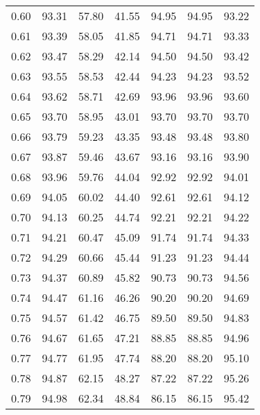 \begin{tabular}{|c|c|c|c|c|c|c|}
      0.60 &     93.31 &     57.80 &      41.55 &   94.95 &      94.95 &         93.22 \\
      0.61 &     93.39 &     58.05 &      41.85 &   94.71 &      94.71 &         93.33 \\
      0.62 &     93.47 &     58.29 &      42.14 &   94.50 &      94.50 &         93.42 \\
      0.63 &     93.55 &     58.53 &      42.44 &   94.23 &      94.23 &         93.52 \\
      0.64 &     93.62 &     58.71 &      42.69 &   93.96 &      93.96 &         93.60 \\
      0.65 &     93.70 &     58.95 &      43.01 &   93.70 &      93.70 &         93.70 \\
      0.66 &     93.79 &     59.23 &      43.35 &   93.48 &      93.48 &         93.80 \\
      0.67 &     93.87 &     59.46 &      43.67 &   93.16 &      93.16 &         93.90 \\
      0.68 &     93.96 &     59.76 &      44.04 &   92.92 &      92.92 &         94.01 \\
      0.69 &     94.05 &     60.02 &      44.40 &   92.61 &      92.61 &         94.12 \\
      0.70 &     94.13 &     60.25 &      44.74 &   92.21 &      92.21 &         94.22 \\
      0.71 &     94.21 &     60.47 &      45.09 &   91.74 &      91.74 &         94.33 \\
      0.72 &     94.29 &     60.66 &      45.44 &   91.23 &      91.23 &         94.44 \\
      0.73 &     94.37 &     60.89 &      45.82 &   90.73 &      90.73 &         94.56 \\
      0.74 &     94.47 &     61.16 &      46.26 &   90.20 &      90.20 &         94.69 \\
      0.75 &     94.57 &     61.42 &      46.75 &   89.50 &      89.50 &         94.83 \\
      0.76 &     94.67 &     61.65 &      47.21 &   88.85 &      88.85 &         94.96 \\
      0.77 &     94.77 &     61.95 &      47.74 &   88.20 &      88.20 &         95.10 \\
      0.78 &     94.87 &     62.15 &      48.27 &   87.22 &      87.22 &         95.26 \\
      0.79 &     94.98 &     62.34 &      48.84 &   86.15 &      86.15 &         95.42 \\

\end{tabular}
